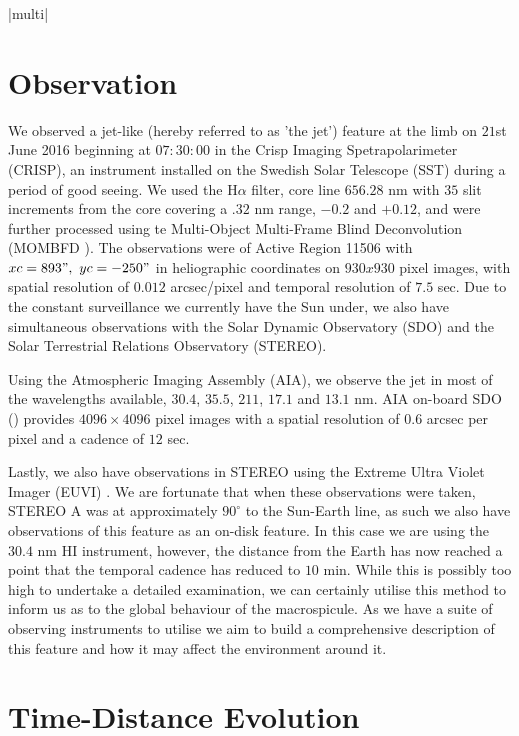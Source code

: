\documentclass{emulateapj}
\begin{document}
\py[Onset]|multi|



\section{Observation}
\label{obs_sect}
We observed a jet-like (hereby referred to as 'the jet') feature at the limb on $21$st June 2016 beginning at $07:30:00$ in the Crisp Imaging Spetrapolarimeter (CRISP), an instrument installed on the Swedish Solar Telescope (SST) during a period of good seeing. %
We used the H$\alpha$ filter, core line $656.28$ nm with $35$ slit increments from the core covering a $.32$ nm range, $-0.2$ and $+0.12$, and were further processed using te Multi-Object Multi-Frame Blind Deconvolution (MOMBFD \cite{vanNoort2005}).
The observations were of Active Region 11506 with $xc = 893",\ yc = -250"$ in heliographic coordinates on $930x930$ pixel images, with spatial resolution of $0.012$ arcsec/pixel and temporal resolution of $7.5$ sec.
Due to the constant surveillance we currently have the Sun under, we also have simultaneous observations with the Solar Dynamic Observatory (SDO) and the Solar Terrestrial Relations Observatory (STEREO).

Using the Atmospheric Imaging Assembly (AIA), we observe the jet in most of the wavelengths available, $30.4$, $35.5$, $211$, $17.1$ and $13.1$ nm.
AIA on-board SDO (\cite{AIAspec}) provides $4096 \times 4096$ pixel images with a spatial resolution of $0.6$ arcsec per pixel and a cadence of $12$ sec.

Lastly, we also have observations in STEREO using the Extreme Ultra Violet Imager (EUVI) \citep{Defise2001}. 
We are fortunate that when these observations were taken, STEREO A was at approximately $90^\circ$ to the Sun-Earth line, as such we also have observations of this feature as an on-disk feature.
In this case we are using the $30.4$ nm HI instrument, however, the distance from the Earth has now reached a point that the temporal cadence has reduced to $10$ min.
While this is possibly too high to undertake a detailed examination, we can certainly utilise this method to inform us as to the global behaviour of the macrospicule.
As we have a suite of observing instruments to utilise we aim to build a comprehensive description of this feature and how it may affect the environment around it.


\section{Time-Distance Evolution}
\label{time_dist_sect}
\end{document}
